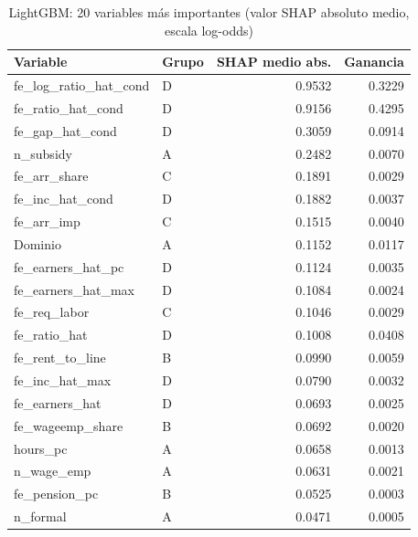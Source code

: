 \begin{table}[ht]
\centering
\begin{tabular}{llrr}
  \hline
Variable & Grupo & SHAP medio abs. & Ganancia \\ 
  \hline
fe\_log\_ratio\_hat\_cond & D & 0.9532 & 0.3229 \\ 
  fe\_ratio\_hat\_cond & D & 0.9156 & 0.4295 \\ 
  fe\_gap\_hat\_cond & D & 0.3059 & 0.0914 \\ 
  n\_subsidy & A & 0.2482 & 0.0070 \\ 
  fe\_arr\_share & C & 0.1891 & 0.0029 \\ 
  fe\_inc\_hat\_cond & D & 0.1882 & 0.0037 \\ 
  fe\_arr\_imp & C & 0.1515 & 0.0040 \\ 
  Dominio & A & 0.1152 & 0.0117 \\ 
  fe\_earners\_hat\_pc & D & 0.1124 & 0.0035 \\ 
  fe\_earners\_hat\_max & D & 0.1084 & 0.0024 \\ 
  fe\_req\_labor & C & 0.1046 & 0.0029 \\ 
  fe\_ratio\_hat & D & 0.1008 & 0.0408 \\ 
  fe\_rent\_to\_line & B & 0.0990 & 0.0059 \\ 
  fe\_inc\_hat\_max & D & 0.0790 & 0.0032 \\ 
  fe\_earners\_hat & D & 0.0693 & 0.0025 \\ 
  fe\_wageemp\_share & B & 0.0692 & 0.0020 \\ 
  hours\_pc & A & 0.0658 & 0.0013 \\ 
  n\_wage\_emp & A & 0.0631 & 0.0021 \\ 
  fe\_pension\_pc & B & 0.0525 & 0.0003 \\ 
  n\_formal & A & 0.0471 & 0.0005 \\ 
   \hline
\end{tabular}
\caption{LightGBM: 20 variables más importantes (valor SHAP absoluto medio, escala log-odds)} 
\end{table}
